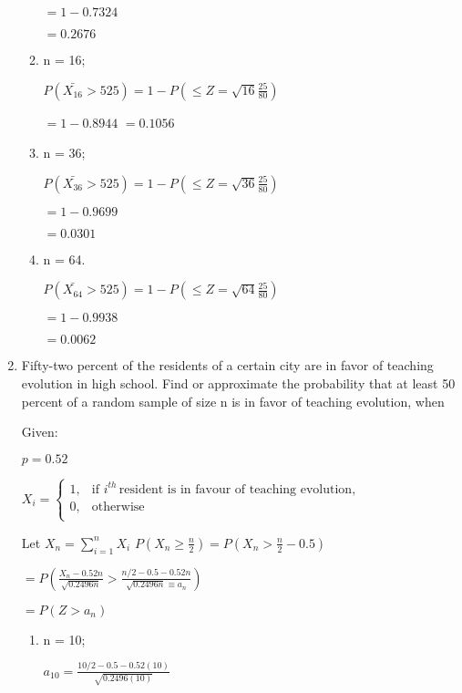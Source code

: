 \documentclass{article}
\begin{document}
\begin{enumerate}
\begin{enumerate}
         $= 1 - 0.7324$

         $= 0.2676$

        \item n = 16;

        $\displaystyle P(\bar{X_16} > 525) = 1 - P\left(\leq Z = \sqrt{16}\frac{25}{80}\right)$
        
        $= 1 - 0.8944$
        $= 0.1056$

        \item n = 36;

        $\displaystyle P(\bar{X_36} > 525) = 1 - P\left(\leq Z = \sqrt{36}\frac{25}{80}\right)$
        
        $= 1 - 0.9699$
        
        $= 0.0301$

        \item n = 64.

        $\displaystyle P(\bar{X_64} > 525) = 1 - P\left(\leq Z = \sqrt{64}\frac{25}{80}\right)$
        
        $= 1 - 0.9938$
        
        $= 0.0062$
    \end{enumerate}
    \item Fifty-two percent of the residents of a certain city are in favor of teaching evolution in high school. Find or approximate the probability that at least 50 percent of a random sample of size n is in favor of teaching evolution, when
    
    Given:

    $p = 0.52$

    $X_i = 
    \begin{cases}
    1, & \text{if } i^{th} \, \text{resident is in favour of teaching evolution},\\
    0, & \text{otherwise}\\
    \end{cases}$

    Let $X_n = \displaystyle \sum_{i=1}^n{X_i}$
    $P\left(X_n \geq \frac{n}{2}\right) = P\left(X_n > \frac{n}{2} - 0.5\right)$

    $= P\left(\frac{X_n - 0.52n}{\sqrt{0.2496n}} > \frac{n/2 - 0.5 - 0.52n}{\sqrt{0.2496n} \equiv a_n}\right)$

    $= P(Z > a_n)$

    \begin{enumerate}
        \item n = 10;
        
        $a_{10} = \frac{10/2 - 0.5 -0.52(10)}{\sqrt{0.2496(10)}}$


\end{enumerate}
\end{enumerate}
\end{document}
